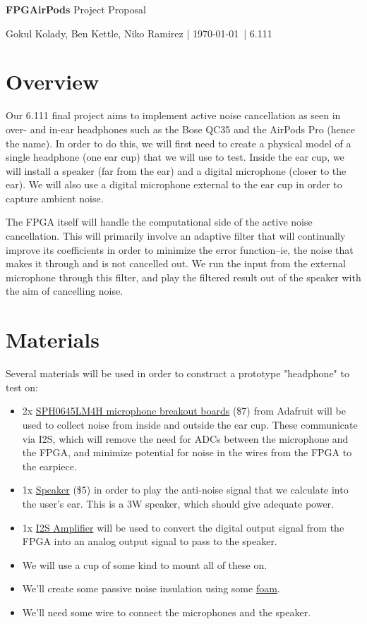 \documentclass[12pt]{fpgairpods}
\begin{document}
{\Huge \textbf{FPGAirPods} Project Proposal}

\vspace{2mm}
{Gokul Kolady, Ben Kettle, Niko Ramirez | \today \ | 6.111}
\vspace{5mm}


\begin{multicols}{2}
\section{Overview}
Our 6.111 final project aims to implement active noise cancellation as seen in over- and in-ear headphones such as the Bose QC35 and the AirPods Pro (hence the name). In order to do this, we will first need to create a physical model of a single headphone (one ear cup) that we will use to test. Inside the ear cup, we will install a speaker (far from the ear) and a digital microphone (closer to the ear). We will also use a digital microphone external to the ear cup in order to capture ambient noise.

The FPGA itself will handle the computational side of the active noise cancellation. This will primarily involve an adaptive filter that will continually improve its coefficients in order to minimize the error function--ie, the noise that makes it through and is not cancelled out. We run the input from the external microphone through this filter, and play the filtered result out of the speaker with the aim of cancelling noise.

\section{Materials}


Several materials will be used in order to construct a prototype "headphone" to test on: 
\begin{itemize}
    \item 2x \href{https://www.adafruit.com/product/3421}{SPH0645LM4H microphone breakout boards} (\$7) from Adafruit will be used to collect noise from inside and outside the ear cup. These communicate via I2S, which will remove the need for ADCs between the microphone and the FPGA, and minimize potential for noise in the wires from the FPGA to the earpiece.
    \item 1x \href{https://www.adafruit.com/product/3968}{Speaker} (\$5) in order to play the anti-noise signal that we calculate into the user's ear. This is a 3W speaker, which should give adequate power.
    \item 1x \href{https://www.adafruit.com/product/3006}{I2S Amplifier} will be used to convert the digital output signal from the FPGA into an analog output signal to pass to the speaker.
    \item We will use a cup of some kind to mount all of these on.
    \item We'll create some passive noise insulation using some \href{https://www.amazon.com/Silverstone-21-Inch-Dampening-Acoustic-SF01/dp/B0040JHMH6?th=1}{foam}.
    \item We'll need some wire to connect the microphones and the speaker.
\end{itemize}


\end{multicols}
\end{document}
